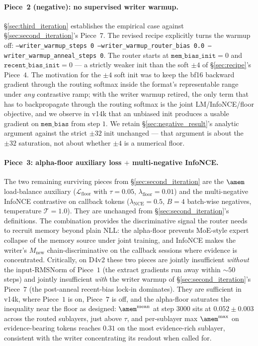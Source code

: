 \paragraph{Piece~2 (negative): no supervised writer warmup.}
\S\ref{sec:third_iteration} establishes the empirical case against
\S\ref{sec:second_iteration}'s Piece~$7$. The revised recipe
explicitly turns the warmup off:
\texttt{--writer\_warmup\_steps 0
--writer\_warmup\_router\_bias 0.0
--writer\_warmup\_anneal\_steps 0}. The router starts at
$\texttt{mem\_bias\_init}{=}0$ and
$\texttt{recent\_bias\_init}{=}0$ --- a strictly weaker init than
the soft $\pm 4$ of \S\ref{sec:recipe}'s Piece~$4$. The motivation
for the $\pm 4$ soft init was to keep the bf16 backward gradient
through the routing softmax inside the format's representable range
under \emph{any} contrastive ramp; with the writer warmup retired,
the only term that has to backpropagate through the routing softmax
is the joint LM/InfoNCE/floor objective, and we observe in v14k
that an unbiased init produces a usable gradient on
$\texttt{mem\_bias}$ from step $1$. We retain
\S\ref{sec:negative_result}'s analytic argument against the strict
$\pm 32$ init unchanged --- that argument is about the $\pm 32$
saturation, not about whether $\pm 4$ is a numerical floor.

\paragraph{Piece~3: alpha-floor auxiliary loss $+$ multi-negative InfoNCE.}
The two remaining surviving pieces from
\S\ref{sec:second_iteration} are the $\amem$ load-balance auxiliary
($\mathcal{L}_{\text{floor}}$ with $\tau{=}0.05$,
$\lambda_{\text{floor}}{=}0.01$) and the multi-negative InfoNCE
contrastive on callback tokens
($\lambda_{\text{NCE}}{=}0.5$, $B{=}4$ batch-wise negatives,
temperature $\mathcal{T}{=}1.0$). They are unchanged from
\S\ref{sec:second_iteration}'s definitions. The combination provides
the discriminative signal the router needs to recruit memory beyond
plain NLL: the alpha-floor prevents MoE-style expert collapse of
the memory source under joint training, and InfoNCE makes the
writer's $M_{\text{new}}$ chain-discriminative on the callback
sessions where evidence is concentrated. Critically, on D4v2 these
two pieces are jointly insufficient \emph{without} the input-RMSNorm
of Piece~$1$ (the extract gradients run away within $\sim\!50$
steps) and jointly insufficient \emph{with} the writer warmup of
\S\ref{sec:second_iteration}'s Piece~$7$ (the post-anneal recent-bias
lock-in dominates). They are sufficient in v14k, where Piece~$1$ is
on, Piece~$7$ is off, and the alpha-floor saturates the inequality
near the floor as designed: $\amem^{\text{mean}}$ at step $3000$
sits at $0.052 \pm 0.003$ across the routed sublayers, just above
$\tau$, and per-sublayer max $\amem^{\text{max}}$ on
evidence-bearing tokens reaches $0.31$ on the most evidence-rich
sublayer, consistent with the writer concentrating its readout
when called for.

